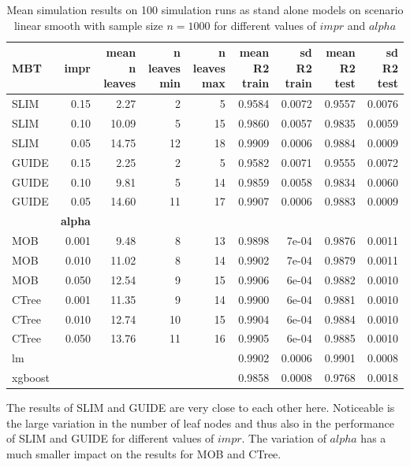 \begin{table} 
\caption{Mean simulation results on 100 simulation runs as stand alone models on scenario linear smooth with sample size $n = 1000$ for different values of $impr$ and $alpha$}
\centering \tiny
\begin{tabular}[t]{l|r|r|r|r|r|r|r|r}
\hline
MBT & \textbf{impr} & mean n leaves & n leaves min & n leaves max & mean R2 train & sd R2 train & mean R2 test & sd R2 test\\
\hline
SLIM & 0.15 & 2.27 & 2 & 5 & 0.9584 & 0.0072 & 0.9557 & 0.0076\\
SLIM & 0.10 & 10.09 & 5 & 15 & 0.9860 & 0.0057 & 0.9835 & 0.0059\\
SLIM & 0.05 & 14.75 & 12 & 18 & 0.9909 & 0.0006 & 0.9884 & 0.0009\\
GUIDE & 0.15 & 2.25 & 2 & 5 & 0.9582 & 0.0071 & 0.9555 & 0.0072\\
GUIDE & 0.10 & 9.81 & 5 & 14 & 0.9859 & 0.0058 & 0.9834 & 0.0060\\
GUIDE & 0.05 & 14.60 & 11 & 17 & 0.9907 & 0.0006 & 0.9883 & 0.0009\\
\hline
 & \textbf{alpha} &  &  &  &  &  &  & \\
\hline
MOB & 0.001 & 9.48 & 8 & 13 & 0.9898 & 7e-04 & 0.9876 & 0.0011\\
MOB & 0.010 & 11.02 & 8 & 14 & 0.9902 & 7e-04 & 0.9879 & 0.0011\\
MOB & 0.050 & 12.54 & 9 & 15 & 0.9906 & 6e-04 & 0.9882 & 0.0010\\
CTree & 0.001 & 11.35 & 9 & 14 & 0.9900 & 6e-04 & 0.9881 & 0.0010\\
CTree & 0.010 & 12.74 & 10 & 15 & 0.9904 & 6e-04 & 0.9884 & 0.0010\\
CTree & 0.050 & 13.76 & 11 & 16 & 0.9905 & 6e-04 & 0.9885 & 0.0010\\
\hline
lm & & & & & 0.9902 & 0.0006 & 0.9901 & 0.0008\\
xgboost & & & & & 0.9858 & 0.0008 & 0.9768 & 0.0018\\
\hline
\end{tabular}
\label{tab:linear_smooth_summary}
\end{table}
The results of SLIM and GUIDE are very close to each other here. Noticeable is the large variation in the number of leaf nodes and thus also in the performance of SLIM and GUIDE for different values of $impr$. The variation of $alpha$ has a much smaller impact on the results for MOB and CTree.

